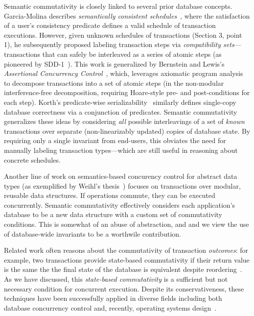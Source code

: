 Semantic commutativity is closely linked to several prior database
concepts. Garcia-Molina describes \textit{semantically consistent
  schedules}~\cite{garciamolina-semantics}, where the satisfaction of
a user's consistency predicate defines a valid schedule of transaction
executions. However, given unknown schedules of transactions (Section
3, point 1), he subsequently proposed labeling transaction steps via
\textit{compatibility sets}---transactions that can safely be
interleaved as a series of atomic steps (as pioneered by SDD-1~\cite{sdd1}). This work is generalized by
Bernstein and Lewis's \textit{Assertional Concurrency
  Control}~\cite{decomp-semantics}, which, leverages axiomatic program
analysis to decompose transactions into a set of atomic steps (in the
non-modular interference-free decomposition, requiring Hoare-style
pre- and post-conditions for each step). Korth's predicate-wise
serializability~\cite{korth-serializability} similarly defines
single-copy database correctness via a conjunction of
predicates. Semantic commutativity generalizes these ideas by
considering \textit{all} possible interleavings of a set of
\textit{known} transactions over separate (non-linearizably updated)
copies of database state. By requiring only a single invariant from
end-users, this obviates the need for manually labeling transaction
types---which are still useful in reasoning about concrete schedules.

Another line of work on semantics-based concurency control for
abstract data types (as exemplified by Weihl's
thesis~\cite{weihl-thesis}) focuses on transactions over modular,
reusable data structures. If operations commute, they can be executed
concurrently. Semantic commutativity effectively considers each
application's database to be a new data structure with a custom set of
commutativity conditions. This is somewhat of an abuse of abstraction,
and and we view the use of database-wide invariants to be a worthwile
contribution.

 Related work often reasons about
the commutativity of transaction \textit{outcomes}: for example, two
transactions provide state-based commutativity if their return value
is the same the the final state of the database is equivalent despite
reordering~\cite{kohler-commutativity,weihl-thesis}. As we have
discussed, this \textit{state-based commutativity} is a sufficient but
not necessary condition for concurrent execution. Despite its
conservativeness, these techniques have been successfully applied in
diverse fields including both database concurrency control and,
recently, operating systems design~\cite{kohler-commutativity}.

